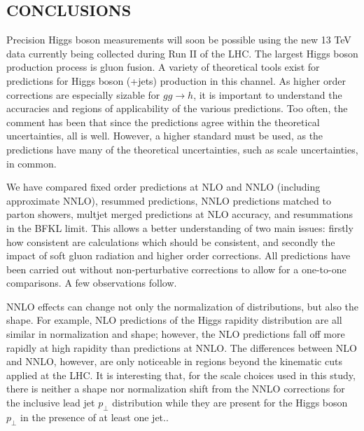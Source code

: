 \subsection{CONCLUSIONS}
\label{sec:hjetscomp:conclusions}

Precision Higgs boson measurements will soon be possible using the new
13 TeV data currently being collected during Run II of the LHC.
The largest Higgs boson production process is gluon fusion. A variety of theoretical 
tools exist for predictions for Higgs boson (+jets) production in this 
channel. As higher order corrections are especially sizable for $gg\to h$, 
it is important to understand the accuracies and regions of applicability 
of the various predictions. Too often, the comment has been that since 
the predictions agree within the theoretical uncertainties, all is well. 
However, a higher standard must be used, as the predictions have many of 
the theoretical uncertainties, such as scale uncertainties, in common. 

We have compared fixed order predictions at NLO and NNLO (including 
approximate NNLO), resummed predictions, NNLO predictions matched to parton 
showers, multjet merged predictions at NLO accuracy, and resummations 
in the BFKL limit. This allows a better understanding of two main issues: firstly how 
consistent are calculations which should be consistent, and secondly the impact 
of soft gluon radiation and higher order corrections. All predictions have 
been carried out without non-perturbative corrections to allow for a one-to-one 
comparisons. A few observations follow. 

NNLO effects can change not only the normalization of distributions, but 
also the shape. For example, NLO predictions of the Higgs rapidity 
distribution are all similar in normalization and shape; however, the 
NLO predictions fall off more rapidly at high rapidity than predictions 
at NNLO. The differences between NLO and NNLO, however, are only 
noticeable in regions beyond the kinematic cuts applied at the LHC. It is 
interesting that, for the scale choices used in this study, there is 
neither a shape nor normalization shift from the NNLO corrections for the 
inclusive lead jet $p_\perp$ distribution while they are present for 
the Higgs boson $p_\perp$ in the presence of at least one jet.. 

